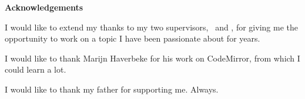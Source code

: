 \noindent \textbf{Acknowledgements}
\thispagestyle{empty}
\vspace*{1cm}

\noindent I would like to extend my thanks to my two supervisors, \firstsupervisor \ and \secondsupervisor, for giving me the opportunity to work on a topic I have been passionate about for years.


\medskip
\noindent I would like to thank Marijn Haverbeke for his work on CodeMirror, from which I could learn a lot.

\medskip
\noindent I would like to thank my father for supporting me. Always.